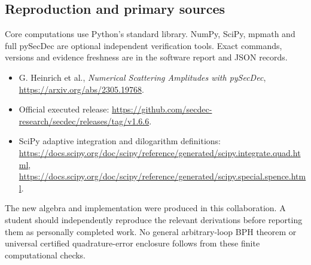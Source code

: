 \subsection{Reproduction and primary sources}
Core computations use Python's standard library. NumPy, SciPy, mpmath and
full pySecDec are optional independent verification tools. Exact commands,
versions and evidence freshness are in the software report and JSON records.
\begin{itemize}
\item G. Heinrich et al., \emph{Numerical Scattering Amplitudes with pySecDec},
\url{https://arxiv.org/abs/2305.19768}.
\item Official executed release:
\url{https://github.com/secdec-research/secdec/releases/tag/v1.6.6}.
\item SciPy adaptive integration and dilogarithm definitions:
\url{https://docs.scipy.org/doc/scipy/reference/generated/scipy.integrate.quad.html},
\url{https://docs.scipy.org/doc/scipy/reference/generated/scipy.special.spence.html}.
\end{itemize}
The new algebra and implementation were produced in this collaboration.
A student should independently reproduce the relevant derivations before
reporting them as personally completed work. No general arbitrary-loop BPH
theorem or universal certified quadrature-error enclosure follows from these
finite computational checks.
